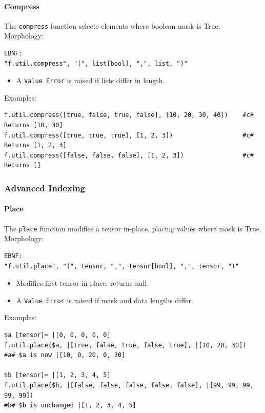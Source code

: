\paragraph{Compress}
The \texttt{compress} function selects elements where boolean mask is True.\\
Morphology:
\begin{verbatim}
EBNF:
"f.util.compress", "(", list[bool], ",", list, ")"
\end{verbatim}
\begin{itemize}
\item A \texttt{Value Error} is raised if lists differ in length.
\end{itemize}
Examples:
\begin{verbatim}
f.util.compress([true, false, true, false], [10, 20, 30, 40])    #c# Returns [10, 30]
f.util.compress([true, true, true], [1, 2, 3])                   #c# Returns [1, 2, 3]
f.util.compress([false, false, false], [1, 2, 3])                #c# Returns []
\end{verbatim}

\subsubsection{Advanced Indexing}

\paragraph{Place}
The \texttt{place} function modifies a tensor in-place, placing values where mask is True.\\
Morphology:
\begin{verbatim}
EBNF:
"f.util.place", "(", tensor, ",", tensor[bool], ",", tensor, ")"
\end{verbatim}
\begin{itemize}
\item Modifies first tensor in-place, returns null
\item A \texttt{Value Error} is raised if mask and data lengths differ.
\end{itemize}
Examples:
\begin{verbatim}
$a [tensor]= |[0, 0, 0, 0, 0]
f.util.place($a, |[true, false, true, false, true], |[10, 20, 30])
#a# $a is now |[10, 0, 20, 0, 30]

$b [tensor]= |[1, 2, 3, 4, 5]
f.util.place($b, |[false, false, false, false, false], |[99, 99, 99, 99, 99])
#b# $b is unchanged |[1, 2, 3, 4, 5]
\end{verbatim}


